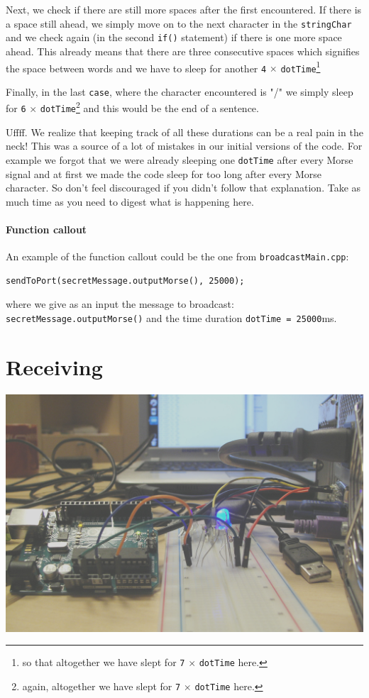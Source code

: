 \documentclass[12pt]{report}
\begin{document}
Next, we check if there are still more spaces after the first encountered. If there is a space still ahead, we simply move on to the next character in the \texttt{stringChar} and we check again (in the second \texttt{if()} statement) if there is one more space ahead. This already means that there are three consecutive spaces which signifies the space between words and we have to sleep for another \verb|4| $\times$ \verb|dotTime|\footnote{so that altogether we have slept for \texttt{7} $\times$ \texttt{dotTime} here.}

Finally, in the last \texttt{case}, where the character encountered is "/" we simply sleep for \verb|6| $\times$ \verb|dotTime|\footnote{again, altogether we have slept for \texttt{7} $\times$ \texttt{dotTime} here.} and this would be the end of a sentence.

Uffff. We realize that keeping track of all these durations can be a real pain in the neck! This was a source of a lot of mistakes in our initial versions of the code. For example we forgot that we were already sleeping one \verb|dotTime| after every Morse signal and at first we made the code sleep for too long after every Morse character. So don't feel discouraged if you didn't follow that explanation. Take as much time as you need to digest what is happening here.

\subsubsection{Function callout}

An example of the function callout could be the one from \texttt{broadcastMain.cpp}:

\begin{lstlisting}
sendToPort(secretMessage.outputMorse(), 25000);
\end{lstlisting}

where we give as an input the message to broadcast: \texttt{secretMessage.outputMorse()} and the time duration \texttt{dotTime = 25000}ms.

\newpage

\chapter{Receiving}

\includegraphics[width = 145mm]{working_1.jpg}
\end{document}
